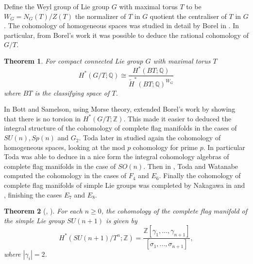 \documentclass{article}
\theoremstyle{plain}
\newtheorem{thm}{Theorem}[section]
\theoremstyle{definition}
\numberwithin{thm}{section}
\begin{document}
		Define the Weyl group of Lie group $G$ with maximal torus $T$ to be
		$W_G=N_G(T)/Z(T)$ the normalizer of $T$ in $G$ quotient the centraliser of $T$ in $G$.
		The cohomology of homogeneous spaces was studied in detail by Borel in \cite{Borel}.
		In particular, from Borel's work it was possible to deduce the rational cohomology of $G/T$.
		\begin{thm}\label{thm:Borel}
			For compact connected Lie group $G$ with maximal torus $T$
			\begin{equation*}
				H^*(G/T;\mathbb{Q})\cong \frac{H^*(BT;\mathbb{Q})}{\tilde{H}^*(BT;\mathbb{Q})^{W_G}}
			\end{equation*}
			where $BT$ is the classifying space of $T$.
		\end{thm}
		In \cite{torG/T} Bott and Samelson, using Morse theory, extended Borel's work by showing that there is no torsion in $H^*(G/T;\mathbb{Z})$.
		This made it easier to deduced the integral structure of the cohomology of complete flag manifolds in the cases of $SU(n),Sp(n)$ and $G_2$.
		Toda later in \cite{toda1975} studied again the cohomology of homogeneous spaces, looking at the mod $p$ cohomology for prime $p$.
		In particular Toda was able to deduce in a nice form the integral cohomology algebras of complete flag manifolds in the case of $SO(n)$.
		Then in \cite{toda1974}, Toda and Watanabe computed the cohomology in the cases of $F_4$ and $E_6$.
		Finally the cohomology of complete flag manifolds of simple Lie groups was completed by Nakagawa in \cite{NakagawaE7} and \cite{nakagawaE8},
		finishing the cases $E_7$ and $E_8$. 
	
		\begin{thm}[\cite{Borel}, \cite{AplicationsOfMorse}]\label{thm:H*SU/T}
			For each $n\geq 0$, the cohomology of the complete flag manifold of the simple Lie group $SU(n+1)$ is given by
			\begin{equation*}
				H^*(SU(n+1)/T^n;\mathbb{Z})=\frac{\mathbb{Z}[\gamma_1,\dots,\gamma_{n+1}]}{[\sigma_1,\dots,\sigma_{n+1}]},
			\end{equation*}
			where $|\gamma_i|=2$.
		\end{thm}
		
\end{document}

